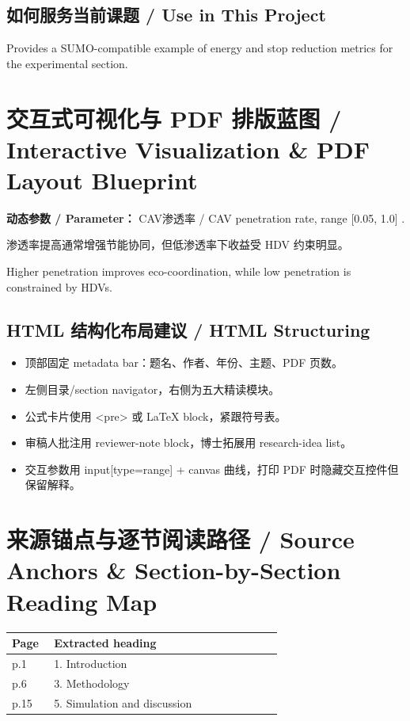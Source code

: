 \documentclass[UTF8,a4paper,11pt,fontset=fandol]{ctexart}
\begin{document}
\subsection{如何服务当前课题 / Use in This Project}
Provides a SUMO-compatible example of energy and stop reduction metrics for the experimental section.

\section{交互式可视化与 PDF 排版蓝图 / Interactive Visualization \& PDF Layout Blueprint}
\textbf{动态参数 / Parameter：} CAV渗透率 / CAV penetration rate, range [0.05, 1.0] .

渗透率提高通常增强节能协同，但低渗透率下收益受 HDV 约束明显。

Higher penetration improves eco-coordination, while low penetration is constrained by HDVs.

\subsection{HTML 结构化布局建议 / HTML Structuring}
\begin{itemize}
\item 顶部固定 metadata bar：题名、作者、年份、主题、PDF 页数。
\item 左侧目录/section navigator，右侧为五大精读模块。
\item 公式卡片使用 <pre> 或 LaTeX block，紧跟符号表。
\item 审稿人批注用 reviewer-note block，博士拓展用 research-idea list。
\item 交互参数用 input[type=range] + canvas 曲线，打印 PDF 时隐藏交互控件但保留解释。
\end{itemize}


\section{来源锚点与逐节阅读路径 / Source Anchors \& Section-by-Section Reading Map}
\begin{longtable}{p{0.14\linewidth}p{0.76\linewidth}}
\toprule
Page & Extracted heading\\
\midrule
p.1 & 1. Introduction \\
p.6 & 3. Methodology \\
p.15 & 5. Simulation and discussion \\
\bottomrule
\end{longtable}
\end{document}
